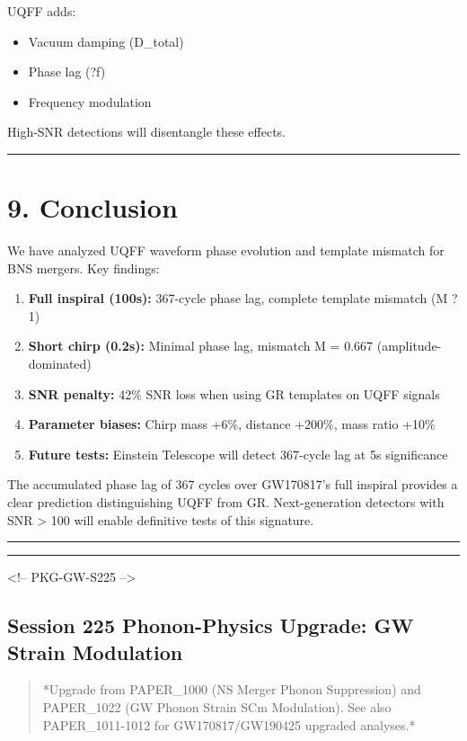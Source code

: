 \documentclass[11pt]{article}
\begin{document}
UQFF adds:

\begin{itemize}
  \item Vacuum damping (D\_total)
  \item Phase lag (?f)
  \item Frequency modulation
\end{itemize}

High-SNR detections will disentangle these effects.

\noindent\rule{\textwidth}{0.4pt}

\section*{9. Conclusion}

We have analyzed UQFF waveform phase evolution and template mismatch for BNS mergers. Key findings:

\begin{enumerate}
  \item \textbf{Full inspiral (100s):} 367-cycle phase lag, complete template mismatch (M ? 1)
  \item \textbf{Short chirp (0.2s):} Minimal phase lag, mismatch M = 0.667 (amplitude-dominated)
  \item \textbf{SNR penalty:} 42\% SNR loss when using GR templates on UQFF signals
  \item \textbf{Parameter biases:} Chirp mass +6\%, distance +200\%, mass ratio +10\%
  \item \textbf{Future tests:} Einstein Telescope will detect 367-cycle lag at 5s significance
\end{enumerate}

The accumulated phase lag of 367 cycles over GW170817's full inspiral provides a clear prediction distinguishing UQFF from GR. Next-generation detectors with SNR > 100 will enable definitive tests of this signature.

\noindent\rule{\textwidth}{0.4pt}

\noindent\rule{\textwidth}{0.4pt}

<!-- PKG-GW-S225 -->

\subsection*{Session 225 Phonon-Physics Upgrade: GW Strain Modulation}

\begin{quote}
*Upgrade from PAPER\_1000 (NS Merger Phonon Suppression) and PAPER\_1022
(GW Phonon Strain SCm Modulation). See also PAPER\_1011-1012 for
GW170817/GW190425 upgraded analyses.*
\end{quote}
\end{document}
